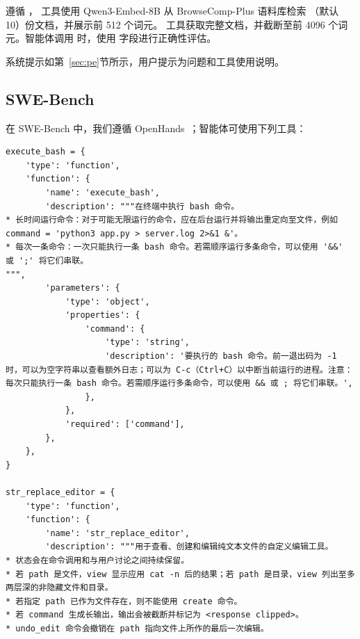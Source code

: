 遵循 \citet{Chen2025BrowseCompPlusAM}， 工具使用 Qwen3-Embed-8B 从 BrowseComp-Plus 语料库检索 （默认 10）份文档，并展示前 512 个词元。 工具获取完整文档，并截断至前 4096 个词元。智能体调用  时，使用  字段进行正确性评估。

系统提示如第~\ref{sec:pe}节所示，用户提示为问题和工具使用说明。

\subsection{SWE-Bench}
在 SWE-Bench 中，我们遵循 OpenHands~\citep{OpenHands2025}；智能体可使用下列工具：
{\footnotesize
\begin{Verbatim}[breaklines, breakanywhere]
execute_bash = {
    'type': 'function',
    'function': {
        'name': 'execute_bash',
        'description': """在终端中执行 bash 命令。
* 长时间运行命令：对于可能无限运行的命令，应在后台运行并将输出重定向至文件，例如 command = 'python3 app.py > server.log 2>&1 &'。
* 每次一条命令：一次只能执行一条 bash 命令。若需顺序运行多条命令，可以使用 '&&' 或 ';' 将它们串联。
""",
        'parameters': {
            'type': 'object',
            'properties': {
                'command': {
                    'type': 'string',
                    'description': '要执行的 bash 命令。前一退出码为 -1 时，可以为空字符串以查看额外日志；可以为 C-c（Ctrl+C）以中断当前运行的进程。注意：每次只能执行一条 bash 命令。若需顺序运行多条命令，可以使用 && 或 ; 将它们串联。',
                },
            },
            'required': ['command'],
        },
    },
}

str_replace_editor = {
    'type': 'function',
    'function': {
        'name': 'str_replace_editor',
        'description': """用于查看、创建和编辑纯文本文件的自定义编辑工具。
* 状态会在命令调用和与用户讨论之间持续保留。
* 若 path 是文件，view 显示应用 cat -n 后的结果；若 path 是目录，view 列出至多两层深的非隐藏文件和目录。
* 若指定 path 已作为文件存在，则不能使用 create 命令。
* 若 command 生成长输出，输出会被截断并标记为 <response clipped>。
* undo_edit 命令会撤销在 path 指向文件上所作的最后一次编辑。


\end{Verbatim}}
